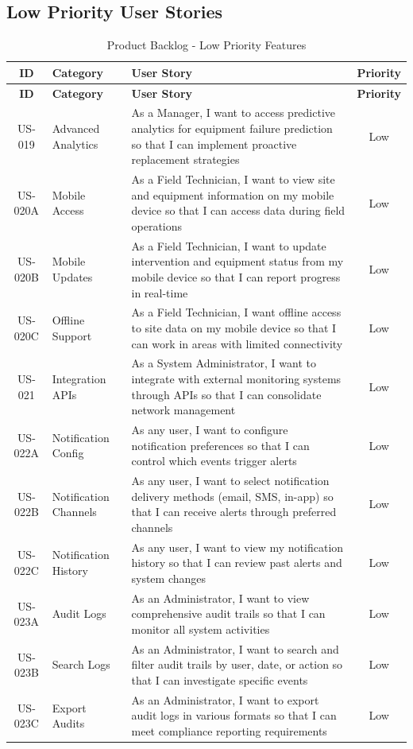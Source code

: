 \subsection{Low Priority User Stories}

\begin{longtable}{|c|p{2.8cm}|p{8.2cm}|c|}
\caption{Product Backlog - Low Priority Features} \\
\hline
\textbf{ID} & \textbf{Category} & \textbf{User Story} & \textbf{Priority} \\
\hline
\endfirsthead
\hline
\textbf{ID} & \textbf{Category} & \textbf{User Story} & \textbf{Priority} \\
\hline
\endhead

US-019 & Advanced Analytics & As a Manager, I want to access predictive analytics for equipment failure prediction so that I can implement proactive replacement strategies & Low \\
\hline
US-020A & Mobile Access & As a Field Technician, I want to view site and equipment information on my mobile device so that I can access data during field operations & Low \\
\hline
US-020B & Mobile Updates & As a Field Technician, I want to update intervention and equipment status from my mobile device so that I can report progress in real-time & Low \\
\hline
US-020C & Offline Support & As a Field Technician, I want offline access to site data on my mobile device so that I can work in areas with limited connectivity & Low \\
\hline
US-021 & Integration APIs & As a System Administrator, I want to integrate with external monitoring systems through APIs so that I can consolidate network management & Low \\
\hline
US-022A & Notification Config & As any user, I want to configure notification preferences so that I can control which events trigger alerts & Low \\
\hline
US-022B & Notification Channels & As any user, I want to select notification delivery methods (email, SMS, in-app) so that I can receive alerts through preferred channels & Low \\
\hline
US-022C & Notification History & As any user, I want to view my notification history so that I can review past alerts and system changes & Low \\
\hline
US-023A & Audit Logs & As an Administrator, I want to view comprehensive audit trails so that I can monitor all system activities & Low \\
\hline
US-023B & Search Logs & As an Administrator, I want to search and filter audit trails by user, date, or action so that I can investigate specific events & Low \\
\hline
US-023C & Export Audits & As an Administrator, I want to export audit logs in various formats so that I can meet compliance reporting requirements & Low \\
\hline
\end{longtable}

